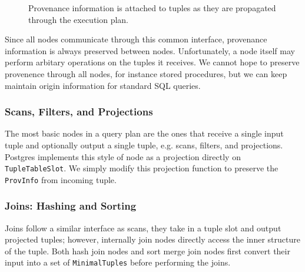 \begin{figure}
  \centering
    
    
    \caption {Provenance information is attached to tuples as they are propagated through the execution plan. }
\end{figure}

Since all nodes communicate through this common interface, provenance information is always preserved between nodes. Unfortunately, a node itself may perform arbitary operations on the tuples it receives. We cannot hope to preserve provenence through all nodes, for instance stored procedures, but we can keep maintain origin information for standard SQL queries.   
 
\subsubsection{Scans, Filters, and Projections}

The most basic nodes in a query plan are the ones that receive a single input tuple and optionally output a single tuple, e.g. scans, filters, and projections. Postgres implements this style of node as a projection directly on \texttt{TupleTableSlot}. We simply modify this projection function to preserve the \texttt{ProvInfo} from incoming tuple.

\subsubsection{Joins: Hashing and Sorting}

Joins follow a similar interface as scans, they take in a tuple slot and output projected tuples; however, internally join nodes directly access the inner structure of the tuple. Both hash join nodes and sort merge join nodes first convert their input into a set of \texttt{MinimalTuples} before performing the joins. 

